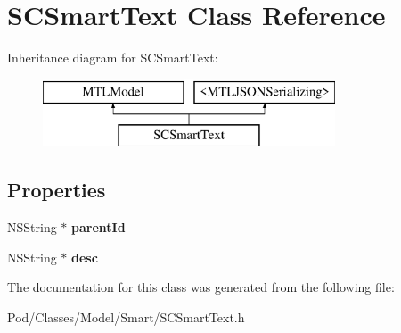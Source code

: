 \hypertarget{interface_s_c_smart_text}{}\section{S\+C\+Smart\+Text Class Reference}
\label{interface_s_c_smart_text}
Inheritance diagram for S\+C\+Smart\+Text\+:\begin{figure}[H]
\begin{center}
\leavevmode
\includegraphics[height=2.000000cm]{interface_s_c_smart_text}
\end{center}
\end{figure}
\subsection*{Properties}
\begin{DoxyCompactItemize}
\item 
N\+S\+String $\ast$ {\bfseries parent\+Id}\hypertarget{interface_s_c_smart_text_aaf098c8d31cd5d9985dd6c19f7f26bd6}{}\label{interface_s_c_smart_text_aaf098c8d31cd5d9985dd6c19f7f26bd6}

\item 
N\+S\+String $\ast$ {\bfseries desc}\hypertarget{interface_s_c_smart_text_a66441fd134b3d2ff62911e023381c81c}{}\label{interface_s_c_smart_text_a66441fd134b3d2ff62911e023381c81c}

\end{DoxyCompactItemize}


The documentation for this class was generated from the following file\+:\begin{DoxyCompactItemize}
\item 
Pod/\+Classes/\+Model/\+Smart/S\+C\+Smart\+Text.\+h\end{DoxyCompactItemize}
